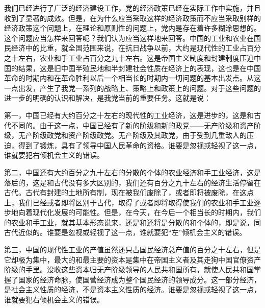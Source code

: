 \documentclass[UTF-8, a5paper, 12pt]{ctexart}
\begin{document}
我们已经进行了广泛的经济建设工作，党的经济政策已经在实际工作中实施，并且收到了显著的成效。但是，在为什么应当采取这样的经济政策而不应当采取别样的经济政策这个问题上，在理论和原则性的问题上，党内是存在着许多糊涂思想的。这个问题应当怎样来回答呢？我们认为应当这样地来回答。中国的工业和农业在国民经济中的比重，就全国范围来说，在抗日战争以前，大约是现代性的工业占百分之十左右，农业和手工业占百分之九十左右。这是帝国主义制度和封建制度压迫中国的结果，这是旧中国半殖民地和半封建社会性质在经济上的表现，这也是在中国革命的时期内和在革命胜利以后一个相当长的时期内一切问题的基本出发点。从这一点出发，产生了我党一系列的战略上、策略上和政策上的问题。对于这些问题的进一步的明确的认识和解决，是我党当前的重要任务。这就是说：

第一，中国已经有大约百分之十左右的现代性的工业经济，这是进步的，这是和古代不同的。由于这一点，中国已经有了新的阶级和新的政党——无产阶级和资产阶级，无产阶级政党和资产阶级政党。无产阶级及其政党，由于受到几重敌人的压迫，得到了锻炼，具有了领导中国人民革命的资格。谁要是忽视或轻视了这一点，谁就要犯右倾机会主义的错误。

第二，中国还有大约百分之九十左右的分散的个体的农业经济和手工业经济，这是落后的，这是和古代没有多大区别的，我们还有百分之九十左右的经济生活停留在古代。古代有封建的土地所有制，现在被我们废除了，或者即将被废除，在这点上，我们已经或者即将区别于古代，取得了或者即将取得使我们的农业和手工业逐步地向着现代化发展的可能性。但是，在今天，在今后一个相当长的时期内，我们的农业和手工业，就其基本形态说来，还是和还将是分散的和个体的，即是说，同古代近似的。谁要是忽视或轻视了这一点，谁就要犯“左”倾机会主义的错误。

第三，中国的现代性工业的产值虽然还只占国民经济总产值的百分之十左右，但是它却极为集中，最大的和最主要的资本是集中在帝国主义者及其走狗中国官僚资产阶级的手里。没收这些资本归无产阶级领导的人民共和国所有，就使人民共和国掌握了国家的经济命脉，使国营经济成为整个国民经济的领导成分。这一部分经济，是社会主义性质的经济，不是资本主义性质的经济。谁要是忽视或轻视了这一点，谁就要犯右倾机会主义的错误。
\end{document}
